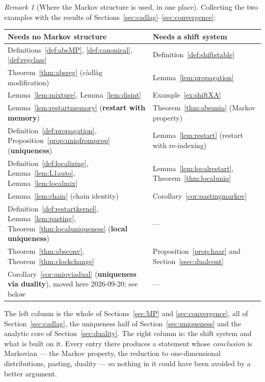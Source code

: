 \documentclass[11pt,a4paper]{article}
\theoremstyle{plain}
\theoremstyle{definition}
\theoremstyle{remark}
\newtheorem{remark}[theorem]{Remark}
\begin{document}
\begin{remark}[Where the Markov structure is used, in one place]
  \label{rem:markovaudit}
  Collecting the two examples with the results of
  Sections~\ref{sec:cadlag}--\ref{sec:convergence}:

  \medskip
  \noindent
  \begin{tabular}{@{}p{}p{}@{}}
  \toprule
  \textbf{Needs no Markov structure} & \textbf{Needs a shift system} \\
  \midrule
  Definitions~\ref{def:absMP}, \ref{def:canonical}, \ref{def:regclass}
    & Definition~\ref{def:shiftstable} \\
  Theorem~\ref{thm:absreg} (c\`adl\`ag modification)
    & Lemma~\ref{lem:propagation} \\
  Lemma~\ref{lem:mixture}, Lemma~\ref{lem:disint}
    & Example~\ref{ex:shiftXA} \\
  Lemma~\ref{lem:restartmemory} (\textbf{restart with memory})
    & Theorem~\ref{thm:absuniq} (Markov property) \\
  Definition~\ref{def:propagation}, Proposition~\ref{prop:uniqfromprop}
    (\textbf{uniqueness}) & Lemma~\ref{lem:restart} (restart with re-indexing) \\
  Definition~\ref{def:localizing}, Lemma~\ref{lem:L1auto},
    Lemma~\ref{lem:localmix} & Lemma~\ref{lem:localrestart},
    Theorem~\ref{thm:localuniq} \\
  Lemma~\ref{lem:chain} (chain identity)
    & Corollary~\ref{cor:pastingmarkov} \\
  Definition~\ref{def:restartkernel}, Lemma~\ref{lem:pasting},
    Theorem~\ref{thm:localuniqueness} (\textbf{local uniqueness})
    & --- \\
  Theorem~\ref{thm:absconv}, Theorem~\ref{thm:clockchange}
    & Proposition~\ref{prop:haar} and Section~\ref{ssec:dualcont} \\
  Corollary~\ref{cor:uniqviadual} (\textbf{uniqueness via duality}), moved here
    2026-09-20; see below & --- \\
  \bottomrule
  \end{tabular}

  \medskip
  \noindent
  The left column is the whole of Sections~\ref{sec:MP} and
  \ref{sec:convergence}, all of Section~\ref{sec:cadlag}, the uniqueness half of
  Section~\ref{sec:uniqueness} and the analytic core of
  Section~\ref{sec:duality}.  The right column is: the shift system and what is
  built on it.  Every entry there produces a statement whose \emph{conclusion} is
  Markovian --- the Markov property, the reduction to one-dimensional
  distributions, pasting, duality --- so nothing in it could have been avoided by
  a better argument.


\end{remark}
\end{document}
